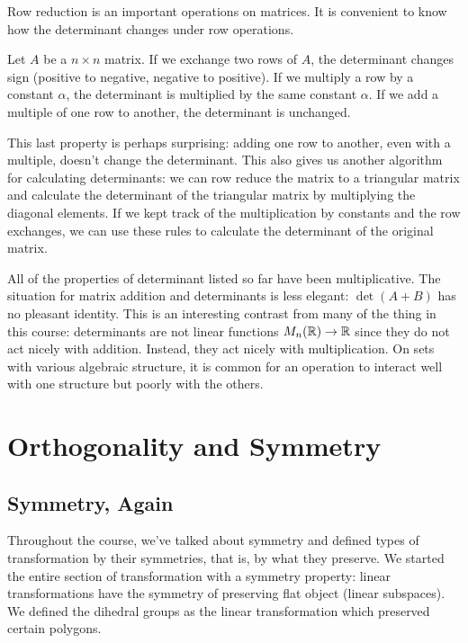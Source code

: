 \documentclass[fleqn]{report}
\begin{document}
Row reduction is an important operations on matrices. It is
convenient to know how the determinant changes under row
operations.

\begin{prop}
Let $A$ be a $n \times n$ matrix. If we exchange two rows of
$A$, the determinant changes sign (positive to negative,
negative to positive). If we multiply a row by a constant
$\alpha$, the determinant is multiplied by the same constant
$\alpha$. If we add a multiple of one row to another, the
determinant is unchanged.
\end{prop}

This last property is perhaps surprising: adding one row to
another, even with a multiple, doesn't change the determinant.
This also gives us another algorithm for calculating
determinants: we can row reduce the matrix to a triangular
matrix and calculate the determinant of the triangular matrix
by multiplying the diagonal elements. If we kept track of the
multiplication by constants and the row exchanges, we can use
these rules to calculate the determinant of the original
matrix.

All of the properties of determinant listed so far have been
multiplicative. The situation for matrix addition and
determinants is less elegant: $\det (A + B)$ has no pleasant
identity. This is an interesting contrast from many of the
thing in this course: determinants are not linear functions
$M_n(\mathbb{R}) \rightarrow \mathbb{R}$ since they do not act nicely with
addition. Instead, they act nicely with multiplication. On
sets with various algebraic structure, it is common for an
operation to interact well with one structure but poorly with
the others.

\chapter{Orthogonality and Symmetry}

\section{Symmetry, Again}

Throughout the course, we've talked about symmetry and defined
types of transformation by their symmetries, that is, by what they
preserve. We started the entire section of transformation with
a symmetry property: linear transformations have the symmetry of
preserving flat object (linear subspaces). We defined the
dihedral groups as the linear transformation which preserved certain
polygons.
\end{document}
